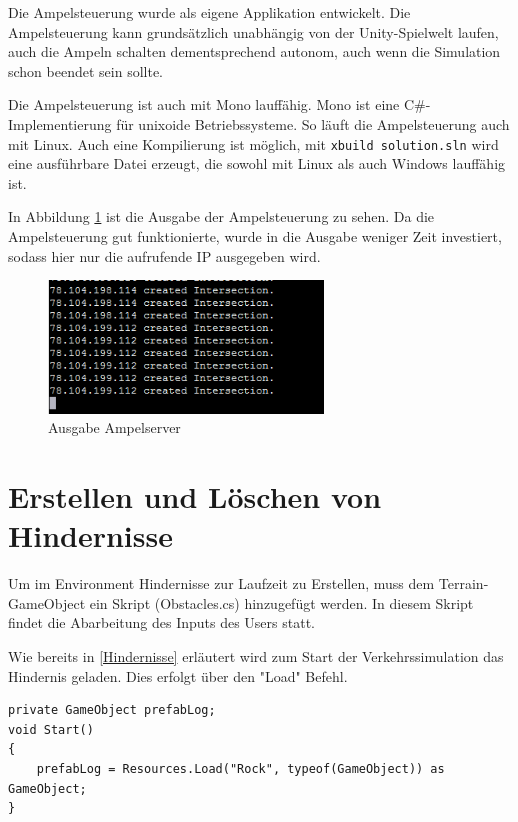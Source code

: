 Die Ampelsteuerung wurde als eigene Applikation entwickelt. Die Ampelsteuerung kann grundsätzlich unabhängig von der Unity-Spielwelt laufen, auch die Ampeln schalten dementsprechend autonom, auch wenn die Simulation schon beendet sein sollte.


Die Ampelsteuerung ist auch mit Mono lauffähig. Mono ist eine C\#-Implementierung für unixoide Betriebssysteme. So läuft die Ampelsteuerung auch mit Linux. Auch eine Kompilierung ist möglich, mit \texttt{xbuild solution.sln} wird eine ausführbare Datei erzeugt, die sowohl mit Linux als auch Windows lauffähig ist.

In Abbildung \ref{img:ampel} ist die Ausgabe der Ampelsteuerung zu sehen. Da die Ampelsteuerung gut funktionierte, wurde in die Ausgabe weniger Zeit investiert, sodass hier nur die aufrufende IP ausgegeben wird.

\begin{figure}[H]
\begin{center}
	\includegraphics[width=0.65\textwidth]{BilderAllgemein/ampelserver.png}
\end{center}
	\caption{Ausgabe Ampelserver}
	\label{img:ampel}
\end{figure}

\section{Erstellen und Löschen von Hindernisse}

Um im Environment Hindernisse zur Laufzeit zu Erstellen, muss dem Terrain-GameObject ein Skript (Obstacles.cs) hinzugefügt werden. In diesem Skript findet die Abarbeitung des Inputs des Users statt.

Wie bereits in \ref{Hindernisse} erläutert wird zum Start der Verkehrssimulation das Hindernis geladen. Dies erfolgt über den "Load" Befehl.

\begin{lstlisting}[caption={Laden des Hindernisses},label={lst:Hinderniss_laden}]
private GameObject prefabLog;
void Start()
{
	prefabLog = Resources.Load("Rock", typeof(GameObject)) as GameObject;
}
\end{lstlisting}

